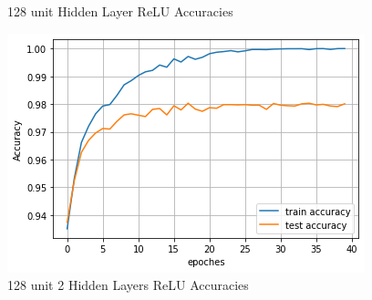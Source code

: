 \documentclass[11pt]{homework}
\begin{document}
\begin{figure}[h!]
\begin{minipage}[h]{0.3\textwidth}
    \caption{128 unit Hidden Layer ReLU Accuracies}
    \label{acc-1-128-relu}
  \end{minipage}
\hfill
   \begin{minipage}[h]{0.3\textwidth}
    \includegraphics[width=\textwidth]{acc-2-128-relu.png}
    \caption{128 unit 2 Hidden Layers ReLU Accuracies}
    \label{acc-2-128-relu}
  \end{minipage}
\end{figure}
\end{document}
